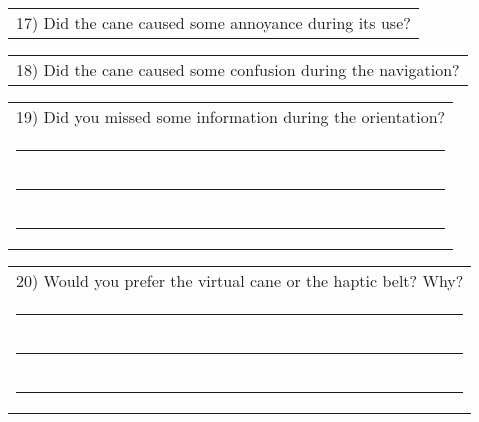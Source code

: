 \begin{table}[!thb]
    \begin{tabular}{m{1\linewidth}}
        \vspace{2ex}
        17)	Did the cane caused some annoyance during its use?
    \end{tabular}

    
    

    \begin{tabular}{m{1\linewidth}}
        \vspace{2ex}
        18)	Did the cane caused some confusion during the navigation?
    \end{tabular}

    
    

    \begin{tabular}{m{1\linewidth}}
        \vspace{2ex}
        19)	Did you missed some information during the orientation? \\


        \noindent
        \rule{6in}{.2mm} \\
        \rule{6in}{.2mm} \\
        \rule{6in}{.2mm}

    \end{tabular}
    \begin{tabular}{m{1\linewidth}}
        \vspace{2ex}
        20)	Would you prefer the virtual cane or the haptic belt? Why? \\


        \noindent
        \rule{6in}{.2mm} \\
        \rule{6in}{.2mm} \\
        \rule{6in}{.2mm}


    \end{tabular}
\end{table}

\FloatBarrier

